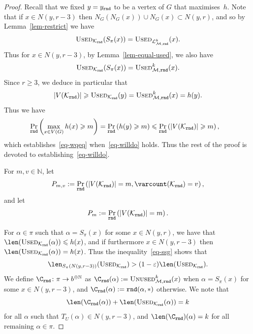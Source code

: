 \documentclass[12pt,a4paper]{article}
\numberwithin{equation}{section}
\theoremstyle{definition}
\newcommand{\al}{{\alpha}}
\newcommand{\eps}{{\varepsilon}}
\newcommand{\de}{{\delta}}
\newcommand{\De}{{\Delta}}
\renewcommand{\ge}{\geqslant}
\renewcommand{\le}{\leqslant}
\newcommand\NN{\mathbb N}
\renewcommand{\cal}[1]{{\mathcal #1}}
\newcommand{\used}{\textsc{Used}}
\newcommand{\unused}{\textsc{Unused}}
\newcommand{\me}{\mathrm{e}}
\begin{document}
\begin{proof}
    Recall that we fixed $y=y_{\normalfont{\texttt{rnd}}}$ to be a vertex of $G$ that maximises~$h$. Note that if  $x\in N(y,r-3)$ then $N_G(N_G(x))\cup N_G(x) \subset N(y,r)$, and so by Lemma~\ref{lem-restrict} we have
    $$
        \used_{\cal K_{\rnd}}(S_\pi(x)) = \used_{\cal L^k_{\cal M,\rnd}}(x).
    $$
    Thus for $x\in N(y,r-3)$, by Lemma~\ref{lem-equal-used}, we also have
    \begin{equation}\label{sp39}
        \used_{\cal K_{\rnd}}(S_\pi(x)) = \used^k_{\cal M,\rnd}(x).
    \end{equation}
    Since $r\ge 3$, we deduce in particular that  
    $$
        |V(\cal K_{\rnd})| \ge \used_{\cal K_{\rnd}}(y)  = \used^k_{\cal M,\rnd}(x) = h(y).
    $$
    Thus we have
    \begin{align*}
    \Pr_{\rnd}\left(\max_{x\in V(G)} h(x)\ge m\right) 
    = \Pr_{\rnd}\left(h(y)\ge m\right)
    & \le \Pr_{\rnd}\left(|V(\cal K_{\rnd})| \ge m\right),
    \end{align*}
    which establishes~\eqref{eq-wqeq} when~\eqref{eq-willdo} holds. Thus the rest of the proof is devoted to establishing~\eqref{eq-willdo}.
    
    For $m,v\in \NN$, let
    $$
    P_{m,v}:= \Pr_{\rnd} \left(|V(\cal K_{\rnd})| = m, \varcount(\cal K_{\rnd})=v\right),
    $$
    and let 
    $$
    P_m :=  \Pr_{\rnd} \left(|V(\cal K_{\rnd})| = m\right).
    $$
    
    
    For $\al \in \pi$ such that $\al = S_\pi(x)$ for some  $x\in N(y,r)$, we have that $\len(\used_{\cal K_{\rnd}}(\al)) \le h(x)$, and if furthermore $x\in N(y,r-3)$ then $\len(\used_{\cal K_{\rnd}}(\al)) = h(x)$. Thus the inequality~\eqref{eq-ssg} shows that  
    $$
        \len_{S_\pi(N(y,r-3))}(\used_{\cal K_{\rnd}})>(1-\eps)\len(\used_{\cal K_{\rnd}}).
    $$
    We define $\C_{\rnd}\colon \pi \to b^{\oplus \NN}$ as $\C_{\rnd}(\al) := \unused^k_{\cal M,\rnd}(x)$ 
    when $\al = S_\pi(x)$ for some $x \in N(y,r-3)$, and $\C_{\rnd}(\al): = \rnd(\al,\ast)$ otherwise. We note that 
    $$
        \len(\C_{\rnd}(\al)) + \len(\used_{\cal K_{\rnd}}(\al)) =k
    $$
    for all $\al$ such that $T_U(\al) \in N(y,r-3)$, and $\len(\C_{\rnd})(\al) = k$ for all remaining $\al\in\pi$. 
    

\end{proof}
\end{document}
